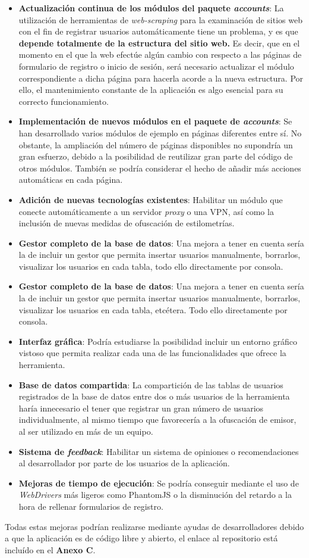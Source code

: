 \begin{itemize}
	\item \textbf{Actualización continua de los módulos del paquete \textit{accounts}}: La utilización de herramientas de \textit{web-scraping} para la examinación de sitios web con el fin de registrar usuarios automáticamente tiene un problema, y es que \textbf{depende totalmente de la estructura del sitio web.} Es decir, que en el momento en el que la web efectúe algún cambio con respecto a las páginas de formulario de registro o inicio de sesión, será necesario actualizar el módulo correspondiente a dicha página para hacerla acorde a la nueva estructura. Por ello, el mantenimiento constante de la aplicación es algo esencial para su correcto funcionamiento.
	\item \textbf{Implementación de nuevos módulos en el paquete de \textit{accounts}}: Se han desarrollado varios módulos de ejemplo en páginas diferentes entre sí. No obstante, la ampliación del número de páginas disponibles no supondría un gran esfuerzo, debido a la posibilidad de reutilizar gran parte del código de otros módulos. También se podría considerar el hecho de añadir más acciones automáticas en cada página.
	\item \textbf{Adición de nuevas tecnologías existentes}: Habilitar un módulo que conecte automáticamente a un servidor \textit{proxy} o una VPN, así como la inclusión de nuevas medidas de ofuscación de estilometrías.
	\item \textbf{Gestor completo de la base de datos}: Una mejora a tener en cuenta sería la de incluir un gestor que permita insertar usuarios manualmente, borrarlos, visualizar los usuarios en cada tabla, todo ello directamente por consola.
	\item \textbf{Gestor completo de la base de datos}: Una mejora a tener en cuenta sería la de incluir un gestor que permita insertar usuarios manualmente, borrarlos, visualizar los usuarios en cada tabla, etcétera. Todo ello directamente por consola.	
	\item \textbf{Interfaz gráfica}: Podría estudiarse la posibilidad incluir un entorno gráfico vistoso que permita realizar cada una de las funcionalidades que ofrece la herramienta.
	\item \textbf{Base de datos compartida}: La compartición de las tablas de usuarios registrados de la base de datos entre dos o más usuarios de la herramienta haría innecesario el tener que registrar un gran número de usuarios individualmente, al mismo tiempo que favorecería a la ofuscación de emisor, al ser utilizado en más de un equipo.
	\item \textbf{Sistema de \textit{feedback}}: Habilitar un sistema de opiniones o recomendaciones al desarrollador por parte de los usuarios de la aplicación.	
	\item \textbf{Mejoras de tiempo de ejecución}: Se podría conseguir mediante el uso de \textit{WebDrivers} más ligeros como PhantomJS o la disminución del retardo a la hora de rellenar formularios de registro.	
	
\end{itemize}


Todas estas mejoras podrían realizarse mediante ayudas de desarrolladores debido a que la aplicación es de código libre y abierto, el enlace al repositorio está incluído en el \textbf{Anexo C}.

\newpage \thispagestyle{empty} %